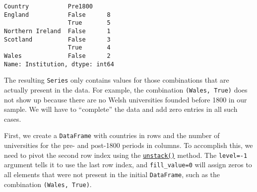 \documentclass[10pt]{scrartcl}
\makeatletter
\newcommand{\boxspacing}{\kern\kvtcb@left@rule\kern\kvtcb@boxsep}
\newcommand{\prompt}[4]{
        {\ttfamily\llap{{\color{#2}[#3]:\hspace{3pt}#4}}\vspace{-\baselineskip}}
    }
\makeatother
\begin{document}
            \begin{tcolorbox}[breakable, size=fbox, boxrule=.5pt, pad at break*=1mm, opacityfill=0]
\prompt{Out}{outcolor}{45}{\boxspacing}
\begin{Verbatim}[commandchars=\\\{\}]
Country           Pre1800
England           False      8
                  True       5
Northern Ireland  False      1
Scotland          False      3
                  True       4
Wales             False      2
Name: Institution, dtype: int64
\end{Verbatim}
\end{tcolorbox}
        
    The resulting \texttt{Series} only contains values for those
combinations that are actually present in the data. For example, the
combination \texttt{(Wales,\ True)} does not show up because there are
no Welsh universities founded before 1800 in our sample. We will have to
``complete'' the data and add zero entries in all such cases.

First, we create a \texttt{DataFrame} with countries in rows and the
number of universities for the pre- and post-1800 periods in columns. To
accomplish this, we need to pivot the second row index using the
\href{https://pandas.pydata.org/pandas-docs/stable/reference/api/pandas.DataFrame.unstack.html}{\texttt{unstack()}}
method. The \texttt{level=-1} argument tells it to use the last row
index, and \texttt{fill\_value=0} will assign zeros to all elements that
were not present in the initial \texttt{DataFrame}, such as the
combination \texttt{(Wales,\ True)}.
\end{document}
